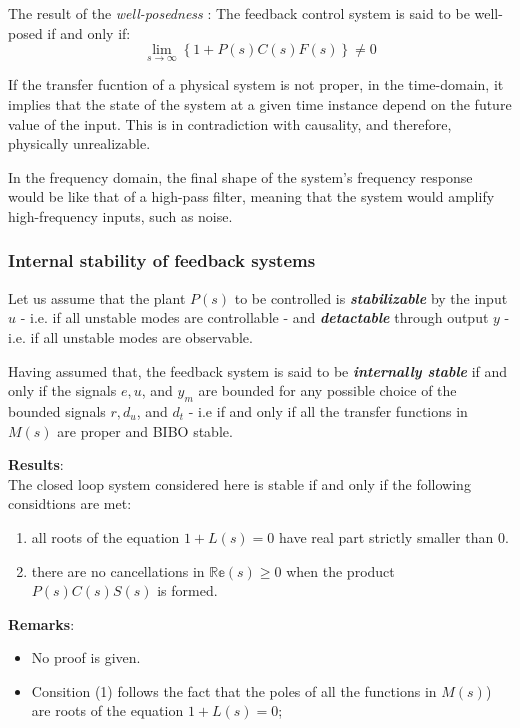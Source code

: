 The result of the \textit{well-posedness
}: The feedback control system is said to be well-posed if and only if:
\[
\lim \limits_{s \to \infty} \left\{1 + P(s)C(s)F(s)\right\} \neq 0
\]

\begin{factbox}
If the transfer fucntion of a physical system is not proper, in the time-domain, it implies that the state of the system at a given time instance depend on the future value of the input. This is in contradiction with causality, and therefore, physically unrealizable.

In the frequency domain, the final shape of the system's frequency response would be like that of a high-pass filter, meaning that the system would amplify high-frequency inputs, such as noise.
\end{factbox}

\subsubsection{Internal stability of feedback systems}
Let us assume that the plant \(P(s)\) to be controlled is \textit{\textbf{stabilizable}} by the input \(u\) - i.e. if all unstable modes are controllable - and \textit{\textbf{detactable}} through output \(y\) - i.e. if all unstable modes are observable. 

Having assumed that, the feedback system is said to be \textit{\textbf{internally stable}} if and only if the signals \(e, u\), and \(y_m\) are bounded for any possible choice of the bounded signals \(r, d_u\), and \(d_t\) - i.e if and only if all the transfer functions in \(M(s)\) are proper and BIBO stable.

\textbf{Results}:\\
The closed loop system considered here is stable if and only if the following considtions are met:
\begin{enumerate}
    \item all roots of the equation \(1 + L(s) = 0\) have real part strictly smaller than \(0\).
    \item there are no cancellations in \(\mathbb{Re}(s)\geq 0 \) when the product \(P(s)C(s)S(s)\) is formed.
\end{enumerate}

\textbf{Remarks}:
\begin{itemize}
    \item No proof is given.
    \item Consition (1) follows the fact that the poles of all the functions in \(M(s)\)) are roots of the equation \(1 + L(s) = 0\);
\end{itemize}

